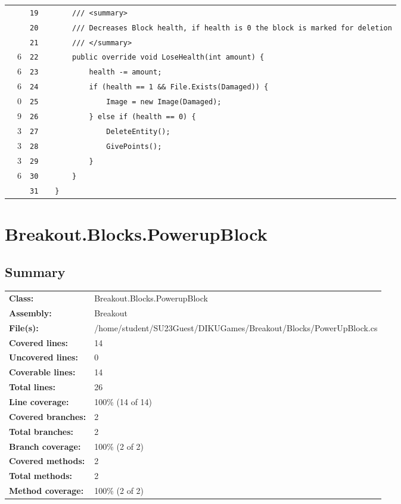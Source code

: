 \documentclass[a4paper,landscape,10pt]{article}
\begin{document}
\begin{longtable}[l]{lrrll}
\cellcolor{gray} &  & \verb~19~ & & \verb~    /// <summary>~\\
\cellcolor{gray} &  & \verb~20~ & & \verb~    /// Decreases Block health, if health is 0 the block is marked for deletion~\\
\cellcolor{gray} &  & \verb~21~ & & \verb~    /// </summary>~\\
\cellcolor{green} & 6 & \verb~22~ & & \verb~    public override void LoseHealth(int amount) {~\\
\cellcolor{green} & 6 & \verb~23~ & & \verb~        health -= amount;~\\
\cellcolor{orange} & 6 & \verb~24~ & & \verb~        if (health == 1 && File.Exists(Damaged)) {~\\
\cellcolor{red} & 0 & \verb~25~ & & \verb~            Image = new Image(Damaged);~\\
\cellcolor{green} & 9 & \verb~26~ & & \verb~        } else if (health == 0) {~\\
\cellcolor{green} & 3 & \verb~27~ & & \verb~            DeleteEntity();~\\
\cellcolor{green} & 3 & \verb~28~ & & \verb~            GivePoints();~\\
\cellcolor{green} & 3 & \verb~29~ & & \verb~        }~\\
\cellcolor{green} & 6 & \verb~30~ & & \verb~    }~\\
\cellcolor{gray} &  & \verb~31~ & & \verb~}~\\
\end{longtable}
\newpage
\section{Breakout.Blocks.PowerupBlock}
\subsection{Summary}
\begin{longtable}[l]{ll}
\textbf{Class:} & Breakout.Blocks.PowerupBlock\\
\textbf{Assembly:} & Breakout\\
\textbf{File(s):} & \begin{minipage}[t]{12cm}{/home/student/SU23Guest/DIKUGames/Breakout/Blocks/PowerUpBlock.cs}\end{minipage} \\
\textbf{Covered lines:} & 14\\
\textbf{Uncovered lines:} & 0\\
\textbf{Coverable lines:} & 14\\
\textbf{Total lines:} & 26\\
\textbf{Line coverage:} & 100\% (14 of 14)\\
\textbf{Covered branches:} & 2\\
\textbf{Total branches:} & 2\\
\textbf{Branch coverage:} & 100\% (2 of 2)\\
\textbf{Covered methods:} & 2\\
\textbf{Total methods:} & 2\\
\textbf{Method coverage:} & 100\% (2 of 2)\\
\end{longtable}
\end{document}
